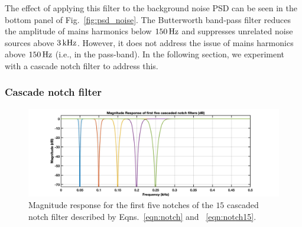 \documentclass[paper-main.tex]{subfiles}
\begin{document}
The effect of applying this filter to the background noise PSD can be seen in the bottom panel of Fig.~\ref{fig:psd_noise}. The Butterworth band-pass filter reduces the amplitude of mains harmonics below $150\,{\rm Hz}$ and suppresses unrelated noise sources above $3\,{\rm kHz}$. However, it does not address the issue of mains harmonics above $150\,{\rm Hz}$ (i.e., in the pass-band). In the following section, we experiment with a cascade notch filter to address this.



\subsubsection{Cascade notch filter}
\begin{figure}
\begin{center}
\includegraphics[width=.9\textwidth]{figures/notch_filter_response.jpg}
\end{center}
\caption{\label{fig:notchMagResponse}
Magnitude response for the first five notches of the $15$ cascaded notch filter described by Eqns.~\ref{eqn:notch} and ~\ref{eqn:notch15}. 
}
\end{figure}
\end{document}
